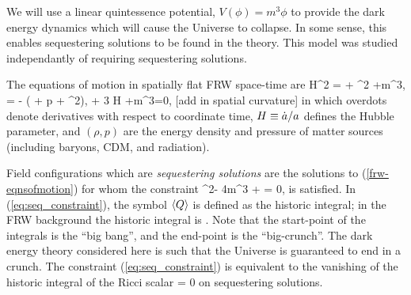 \documentclass[amsmath,amssymb,10pt,twocolumn,eqsecnum]{revtex4}
\newcommand{\comment}[1]{{\color{red}[#1]}}
\newcommand{\Mpsq}[0]{{\qsubrm{M}{pl}^2}}
\begin{document}
We will use a linear quintessence potential, $V(\phi) =  {m}^3\phi$ to provide the dark energy dynamics which will cause the Universe to collapse. In some sense, this enables sequestering solutions to be found in the theory. This model was studied \cite{Kallosh:2003bq} independantly of requiring sequestering solutions.

The equations of motion in spatially flat FRW space-time  are
\bse
\label{frw-eqnsofmotion}
\bea
3\Mpsq H^2 =  {\rho}{ } + \half \dot{\phi}^2 +m^3\phi,
\eea
\bea
3\Mpsq {} = - \left(  {\rho}{ } +  {p}{ } + \dot{\phi}^2\right),
\eea
\bea
\ddot{\phi} + 3 H \dot{\phi} +m^3=0,
\eea
\ese
\comment{add in spatial curvature}
in which overdots denote derivatives with respect to coordinate time, $H \equiv \dot{a}/a$ defines the Hubble parameter, and $(\rho, p)$ are the energy density and pressure of matter sources (including baryons, CDM, and radiation).

Field configurations which are \textit{sequestering solutions} are the solutions to (\ref{frw-eqnsofmotion}) for whom the constraint
\bea
\label{eq:seq_constraint}
\langle\dot{\phi}^2\rangle - 4m^3 \expec{\phi} +  = 0,
\eea
is satisfied. In (\ref{eq:seq_constraint}), the symbol $\left\langle Q\right\rangle$ is defined as the historic integral; in the FRW background the historic integral is
\bea
{}  {}.
\eea
Note that the start-point of the integrals is the ``big bang'', and the end-point is the ``big-crunch''. The dark energy theory considered here is such that the Universe is guaranteed to end in a crunch. The constraint (\ref{eq:seq_constraint}) is equivalent to  the vanishing of the historic integral of the Ricci scalar
\bea
\label{eq:vanish_R}
 = 0
\eea
on sequestering solutions.




 
 
\end{document}
